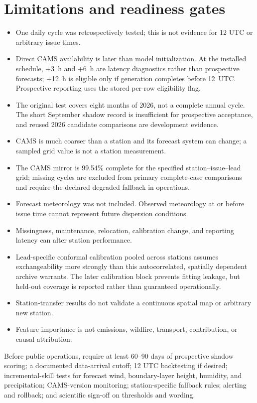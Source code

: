 \documentclass[11pt,a4paper]{article}
\begin{document}
\section{Limitations and readiness gates}
\begin{itemize}
\item One daily cycle was retrospectively tested; this is not evidence for 12 UTC or arbitrary issue times.
\item Direct CAMS availability is later than model initialization. At the installed schedule, +3~h and +6~h are latency diagnostics rather than prospective forecasts; +12~h is eligible only if generation completes before 12~UTC. Prospective reporting uses the stored per-row eligibility flag.
\item The original test covers eight months of 2026, not a complete annual cycle. The short September shadow record is insufficient for prospective acceptance, and reused 2026 candidate comparisons are development evidence.
\item CAMS is much coarser than a station and its forecast system can change; a sampled grid value is not a station measurement.
\item The CAMS mirror is 99.54\% complete for the specified station--issue--lead grid; missing cycles are excluded from primary complete-case comparisons and require the declared degraded fallback in operations.
\item Forecast meteorology was not included. Observed meteorology at or before issue time cannot represent future dispersion conditions.
\item Missingness, maintenance, relocation, calibration change, and reporting latency can alter station performance.
\item Lead-specific conformal calibration pooled across stations assumes exchangeability more strongly than this autocorrelated, spatially dependent archive warrants. The later calibration block prevents fitting leakage, but held-out coverage is reported rather than guaranteed operationally.
\item Station-transfer results do not validate a continuous spatial map or arbitrary new station.
\item Feature importance is not emissions, wildfire, transport, contribution, or causal attribution.
\end{itemize}

Before public operations, require at least 60--90 days of prospective shadow scoring; a documented data-arrival cutoff; 12 UTC backtesting if desired; incremental-skill tests for forecast wind, boundary-layer height, humidity, and precipitation; CAMS-version monitoring; station-specific fallback rules; alerting and rollback; and scientific sign-off on thresholds and wording.
\end{document}
